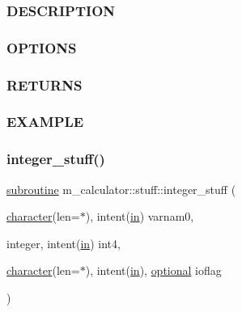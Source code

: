 \subsubsection*{D\+E\+S\+C\+R\+I\+P\+T\+I\+ON}

\subsubsection*{O\+P\+T\+I\+O\+NS}

\subsubsection*{R\+E\+T\+U\+R\+NS}

\subsubsection*{E\+X\+A\+M\+P\+LE}\mbox{\label{interfacem__calculator_1_1stuff_a5fe04fa7587b89cb2980bb8391d071ce}} 
\subsubsection{\texorpdfstring{integer\+\_\+stuff()}{integer\_stuff()}}
{\footnotesize\ttfamily \hyperlink{M__stopwatch_83_8txt_acfbcff50169d691ff02d4a123ed70482}{subroutine} m\+\_\+calculator\+::stuff\+::integer\+\_\+stuff (\begin{DoxyParamCaption}\item[{\hyperlink{option__stopwatch_83_8txt_abd4b21fbbd175834027b5224bfe97e66}{character}(len=$\ast$), intent(\hyperlink{M__journal_83_8txt_afce72651d1eed785a2132bee863b2f38}{in})}]{varnam0,  }\item[{integer, intent(\hyperlink{M__journal_83_8txt_afce72651d1eed785a2132bee863b2f38}{in})}]{int4,  }\item[{\hyperlink{option__stopwatch_83_8txt_abd4b21fbbd175834027b5224bfe97e66}{character}(len=$\ast$), intent(\hyperlink{M__journal_83_8txt_afce72651d1eed785a2132bee863b2f38}{in}), \hyperlink{option__stopwatch_83_8txt_aa4ece75e7acf58a4843f70fe18c3ade5}{optional}}]{ioflag }\end{DoxyParamCaption})\hspace{0.3cm}{\ttfamily [private]}}



